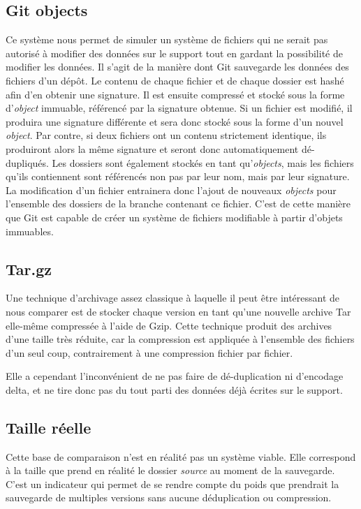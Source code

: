 \documentclass[a4paper]{report}
\begin{document}
\subsection{Git objects}

Ce système nous permet de simuler un système de fichiers qui ne serait
pas autorisé à modifier des données sur le support tout en gardant la
possibilité de modifier les données. Il s'agit de la manière dont Git
sauvegarde les données des fichiers d'un dépôt. Le contenu de chaque
fichier et de chaque dossier est hashé afin d'en obtenir une signature.
Il est ensuite compressé et stocké sous la forme d'\emph{object}
immuable, référencé par la signature obtenue. Si un fichier est modifié,
il produira une signature différente et sera donc stocké sous la forme
d'un nouvel \emph{object}. Par contre, si deux fichiers ont un contenu
strictement identique, ils produiront alors la même signature et seront
donc automatiquement dé-dupliqués. Les dossiers sont également stockés
en tant qu'\emph{objects}, mais les fichiers qu'ils contiennent sont
référencés non pas par leur nom, mais par leur signature. La
modification d'un fichier entrainera donc l'ajout de nouveaux
\emph{objects} pour l'ensemble des dossiers de la branche contenant ce
fichier. C'est de cette manière que Git est capable de créer un système
de fichiers modifiable à partir d'objets immuables.

\subsection{Tar.gz}

Une technique d'archivage assez classique à laquelle il peut être
intéressant de nous comparer est de stocker chaque version en tant
qu'une nouvelle archive Tar elle-même compressée à l'aide de Gzip. Cette
technique produit des archives d'une taille très réduite, car la
compression est appliquée à l'ensemble des fichiers d'un seul coup,
contrairement à une compression fichier par fichier.

Elle a cependant l'inconvénient de ne pas faire de dé-duplication ni
d'encodage delta, et ne tire donc pas du tout parti des données déjà
écrites sur le support.

\subsection{Taille réelle}

Cette base de comparaison n'est en réalité pas un système viable. Elle
correspond à la taille que prend en réalité le dossier \emph{source} au
moment de la sauvegarde. C'est un indicateur qui permet de se rendre
compte du poids que prendrait la sauvegarde de multiples versions sans
aucune déduplication ou compression.
\end{document}
